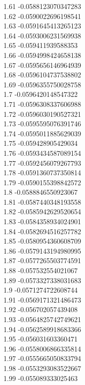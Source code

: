 {1.61	-0.0588123070347283\\
1.62	-0.0590022696198541\\
1.63	-0.0591645413265123\\
1.64	-0.0593006231569938\\
1.65	-0.059411939588353\\
1.66	-0.0594998424658138\\
1.67	-0.0595656146964939\\
1.68	-0.0596104737538802\\
1.69	-0.0596355750028758\\
1.7	-0.0596420148547322\\
1.71	-0.0596308337606988\\
1.72	-0.0596030190527321\\
1.73	-0.0595595076391746\\
1.74	-0.0595011885629039\\
1.75	-0.059428905429034\\
1.76	-0.0593434587089154\\
1.77	-0.0592456079267793\\
1.78	-0.0591360737350814\\
1.79	-0.0590155398842572\\
1.8	-0.0588846550923067\\
1.81	-0.0587440348193558\\
1.82	-0.0585942629520654\\
1.83	-0.0584358934024901\\
1.84	-0.0582694516257782\\
1.85	-0.0580954360608709\\
1.86	-0.0579143194980995\\
1.87	-0.0577265503774591\\
1.88	-0.057532554021067\\
1.89	-0.0573327338031683\\
1.9	-0.0571274722608744\\
1.91	-0.0569171321486473\\
1.92	-0.056702057439408\\
1.93	-0.0564825742749621\\
1.94	-0.0562589918683366\\
1.95	-0.056031603360471\\
1.96	-0.0558006866335814\\
1.97	-0.0555665050833794\\
1.98	-0.0553293083522667\\
1.99	-0.055089333025463\\
}

